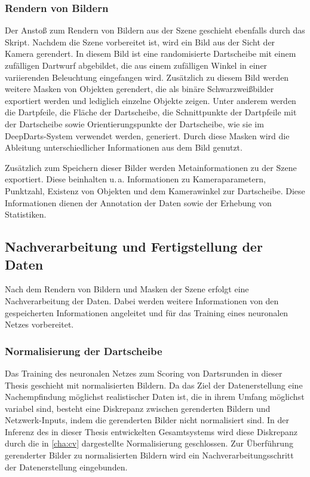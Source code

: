\subsubsection{Rendern von Bildern}

Der Anstoß zum Rendern von Bildern aus der Szene geschieht ebenfalls durch das Skript. Nachdem die Szene vorbereitet ist, wird ein Bild aus der Sicht der Kamera gerendert. In diesem Bild ist eine randomisierte Dartscheibe mit einem zufälligen Dartwurf abgebildet, die aus einem zufälligen Winkel in einer variierenden Beleuchtung eingefangen wird. Zusätzlich zu diesem Bild werden weitere Masken von Objekten gerendert, die als binäre Schwarzweißbilder exportiert werden und lediglich einzelne Objekte zeigen. Unter anderem werden die Dartpfeile, die Fläche der Dartscheibe, die Schnittpunkte der Dartpfeile mit der Dartscheibe sowie Orientierungspunkte der Dartscheibe, wie sie im DeepDarts-System verwendet werden, generiert. Durch diese Masken wird die Ableitung unterschiedlicher Informationen aus dem Bild genutzt.

Zusätzlich zum Speichern dieser Bilder werden Metainformationen zu der Szene exportiert. Diese beinhalten u.\,a. Informationen zu Kameraparametern, Punktzahl, Existenz von Objekten und dem Kamerawinkel zur Dartscheibe. Diese Informationen dienen der Annotation der Daten sowie der Erhebung von Statistiken.


\subsection{Nachverarbeitung und Fertigstellung der Daten}  %
\label{sec:methodik_postprocessing}

Nach dem Rendern von Bildern und Masken der Szene erfolgt eine Nachverarbeitung der Daten. Dabei werden weitere Informationen von den gespeicherten Informationen angeleitet und für das Training eines neuronalen Netzes vorbereitet.

\subsubsection{Normalisierung der Dartscheibe}

Das Training des neuronalen Netzes zum Scoring von Dartsrunden in dieser Thesis geschieht mit normalisierten Bildern. Da das Ziel der Datenerstellung eine Nachempfindung möglichst realistischer Daten ist, die in ihrem Umfang möglichst variabel sind, besteht eine Diskrepanz zwischen gerenderten Bildern und Netzwerk-Inputs, indem die gerenderten Bilder nicht normalisiert sind. In der Inferenz des in dieser Thesis entwickelten Gesamtsystems wird diese Diskrepanz durch die in \autoref{cha:cv} dargestellte Normalisierung geschlossen. Zur Überführung gerenderter Bilder zu normalisierten Bildern wird ein Nachverarbeitungsschritt der Datenerstellung eingebunden.

